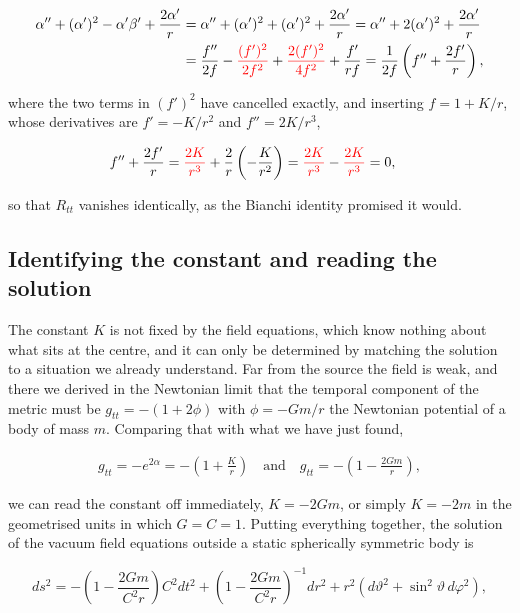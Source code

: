         \begin{align*}
            \alpha'' + (\alpha')^2 - \alpha'\beta' + \frac{2\alpha'}{r} &= \alpha'' + (\alpha')^2 + (\alpha')^2 + \frac{2\alpha'}{r} = \alpha'' + 2(\alpha')^2 + \frac{2\alpha'}{r}\\
            &= \frac{f''}{2f} - {\color{red}\frac{(f')^2}{2f^2}} + {\color{red}\frac{2(f')^2}{4f^2}} + \frac{f'}{rf} = \frac{1}{2f}\left(f'' + \frac{2f'}{r}\right),
        \end{align*}

        where the two terms in $(f')^2$ have cancelled exactly, and inserting $f = 1 + K/r$, whose derivatives are $f' = -K/r^2$ and $f''=2K/r^3$,

        \begin{align*}
            f'' + \frac{2f'}{r} &= {\color{red}\frac{2K}{r^3}} + \frac{2}{r}\left(-\frac{K}{r^2}\right) = {\color{red}\frac{2K}{r^3}} - {\color{red}\frac{2K}{r^3}} = 0,
        \end{align*}

        so that $R_{tt}$ vanishes identically, as the Bianchi identity promised it would.

    \subsection{Identifying the constant and reading the solution}

        The constant $K$ is not fixed by the field equations, which know nothing about what sits at the centre, and it can only be determined by matching the solution to a situation we already understand. Far from the source the field is weak, and there we derived in the Newtonian limit that the temporal component of the metric must be $g_{tt} = -\left(1 + 2\phi\right)$ with $\phi = -Gm/r$ the Newtonian potential of a body of mass $m$. Comparing that with what we have just found,

        \begin{align*}
            g_{tt} = -e^{2\alpha} = -\left(1+\frac{K}{r}\right) \quad\text{and}\quad g_{tt} = -\left(1 - \frac{2Gm}{r}\right),
        \end{align*}

        we can read the constant off immediately, $K = -2Gm$, or simply $K=-2m$ in the geometrised units in which $G=C=1$. Putting everything together, the solution of the vacuum field equations outside a static spherically symmetric body is

        \begin{equation}\label{eq:Schwarzschild}
            ds^2 = -\left(1-\frac{2Gm}{C^2r}\right)C^2dt^2 + \left(1-\frac{2Gm}{C^2r}\right)^{-1}dr^2 + r^2\left(d\vartheta^2 + \sin^2\vartheta\,d\varphi^2\right),
        \end{equation}

